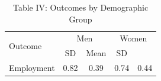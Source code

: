 \begin{table}[htbp]
\centering
\caption{Table IV: Outcomes by Demographic Group}
\begin{tabular}{lcccc}
\toprule
\multirow{2}{*}{Outcome} & \multicolumn{2}{c}{Men} & \multicolumn{2}{c}{Women} \\
Mean & SD & Mean & SD \\
\midrule
Employment & 0.82 & 0.39 & 0.74 & 0.44 \\
\bottomrule
\end{tabular}
\end{table}
